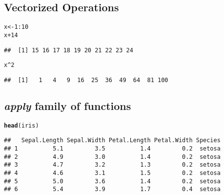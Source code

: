 \documentclass[11pt, a4paper]{article}\usepackage[]{graphicx}\usepackage[]{xcolor}
\makeatletter
\newcommand{\hlnum}[1]{\textcolor[rgb]{0.686,0.059,0.569}{#1}}%
\newcommand{\hlopt}[1]{\textcolor[rgb]{0,0,0}{#1}}%
\newcommand{\hldef}[1]{\textcolor[rgb]{0.345,0.345,0.345}{#1}}%
\newcommand{\hlkwb}[1]{\textcolor[rgb]{0.69,0.353,0.396}{#1}}%
\newcommand{\hlkwd}[1]{\textcolor[rgb]{0.737,0.353,0.396}{\textbf{#1}}}%
\newenvironment{kframe}{%
 \def\at@end@of@kframe{}%
 \ifinner\ifhmode%
  \def\at@end@of@kframe{\end{minipage}}%
  \begin{minipage}{\columnwidth}%
 \fi\fi%
 \def\FrameCommand##1{\hskip\@totalleftmargin \hskip-\fboxsep
 \colorbox{shadecolor}{##1}\hskip-\fboxsep
     \hskip-\linewidth \hskip-\@totalleftmargin \hskip\columnwidth}%
 \MakeFramed {\advance\hsize-\width
   \@totalleftmargin\z@ \linewidth\hsize
   \@setminipage}}%
 {\par\unskip\endMakeFramed%
 \at@end@of@kframe}
\newenvironment{knitrout}{}{} %
\makeatother
\begin{document}
\subsection{Vectorized Operations}

\begin{knitrout}
\color{fgcolor}\begin{kframe}
\begin{alltt}
\hldef{x} \hlkwb{<-} \hlnum{1}\hlopt{:}\hlnum{10}
\hldef{x} \hlopt{+} \hlnum{14}
\end{alltt}
\begin{verbatim}
##  [1] 15 16 17 18 19 20 21 22 23 24
\end{verbatim}
\begin{alltt}
\hldef{x}\hlopt{^}\hlnum{2}
\end{alltt}
\begin{verbatim}
##  [1]   1   4   9  16  25  36  49  64  81 100
\end{verbatim}
\end{kframe}
\end{knitrout}

\subsection{\textbf{\textit{apply} family of functions}}

\begin{knitrout}
\color{fgcolor}\begin{kframe}
\begin{alltt}
\hlkwd{head}\hldef{(iris)}
\end{alltt}
\begin{verbatim}
##   Sepal.Length Sepal.Width Petal.Length Petal.Width Species
## 1          5.1         3.5          1.4         0.2  setosa
## 2          4.9         3.0          1.4         0.2  setosa
## 3          4.7         3.2          1.3         0.2  setosa
## 4          4.6         3.1          1.5         0.2  setosa
## 5          5.0         3.6          1.4         0.2  setosa
## 6          5.4         3.9          1.7         0.4  setosa
\end{verbatim}
\end{kframe}
\end{knitrout}
\end{document}
